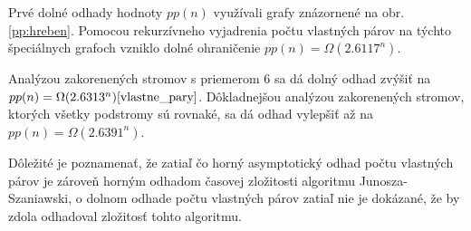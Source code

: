 Prvé dolné odhady hodnoty $pp(n)$ využívali grafy znázornené na obr. \ref{pp:hreben}.
Pomocou rekurzívneho vyjadrenia počtu vlastných párov na týchto špeciálnych grafoch
vzniklo dolné ohraničenie $pp(n) = \Omega(2.6117^n)$.

Analýzou zakorenených stromov s priemerom $6$ sa dá dolný odhad zvýšiť na $pp(n) = \Omega(2.6313^n)\cite{vlastne_pary}$.
Dôkladnejšou analýzou zakorenených stromov, ktorých všetky podstromy sú rovnaké, sa dá
odhad vylepšiť až na $pp(n) = \Omega(2.6391^n)$\cite{vlastne_pary}.

Dôležité je poznamenať, že zatiaľ čo horný asymptotický odhad počtu vlastných párov je zároveň
horným odhadom časovej zložitosti algoritmu Junosza-Szaniawski, o dolnom odhade počtu vlastných
párov zatiaľ nie je dokázané, že by zdola odhadoval zložitosť tohto algoritmu.
